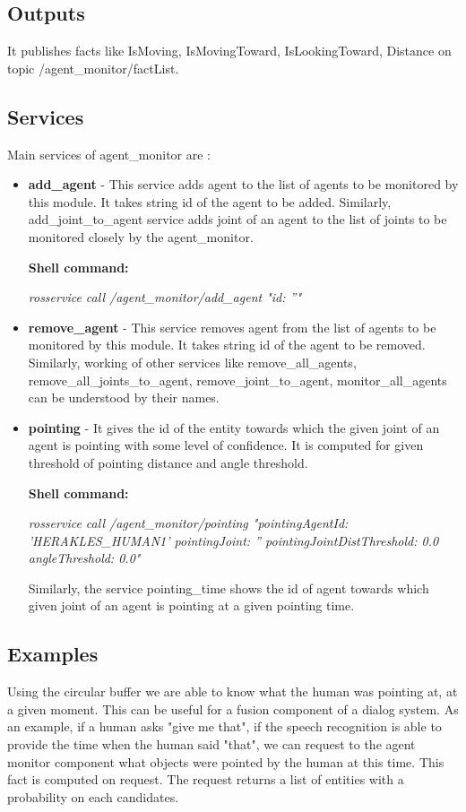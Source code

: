 \documentclass[a4paper]{article}
\begin{document}
\subsection{Outputs}
It publishes facts like IsMoving, IsMovingToward, IsLookingToward, Distance on topic /agent\_monitor/factList.

\subsection{Services}
Main services of agent\_monitor are :

\begin{itemize}
\item \textbf{add\_agent} - This service adds agent to the list of agents to be monitored by this module. It takes string id of the agent to be added. Similarly, add\_joint\_to\_agent service adds joint of an agent to the list of joints to be monitored closely by the agent\_monitor.

\textbf{Shell command:}

\textit{rosservice call /agent\_monitor/add\_agent "id: ''" }

\item \textbf {remove\_agent} - This service removes agent from the list of agents to be monitored by this module. It takes string id of the agent to be removed. Similarly, working of other services like remove\_all\_agents, remove\_all\_joints\_to\_agent, remove\_joint\_to\_agent, monitor\_all\_agents can be understood by their names.

\item \textbf{pointing} - It gives the id of the entity towards which the given joint of an agent is pointing with some level of confidence. It is computed for given threshold of pointing distance and angle threshold.


\textbf{Shell command:}

\textit{rosservice call /agent\_monitor/pointing "pointingAgentId: 'HERAKLES\_HUMAN1'
pointingJoint: ''
pointingJointDistThreshold: 0.0
angleThreshold: 0.0"}

Similarly, the service pointing\_time shows the id of agent towards which given joint of an agent is pointing at a given pointing time.

\end{itemize}

\subsection{Examples}
Using the circular buffer we are able to know what the human was pointing at, at a given moment. This can be useful for a fusion component of a dialog system. As an example, if a human asks "give me that", if the speech recognition is able to provide the time when the human said "that", we can request to the agent monitor component what objects were pointed by the human at this time.
This fact is computed on request. The request returns a list of entities with a probability on each candidates.
\end{document}
